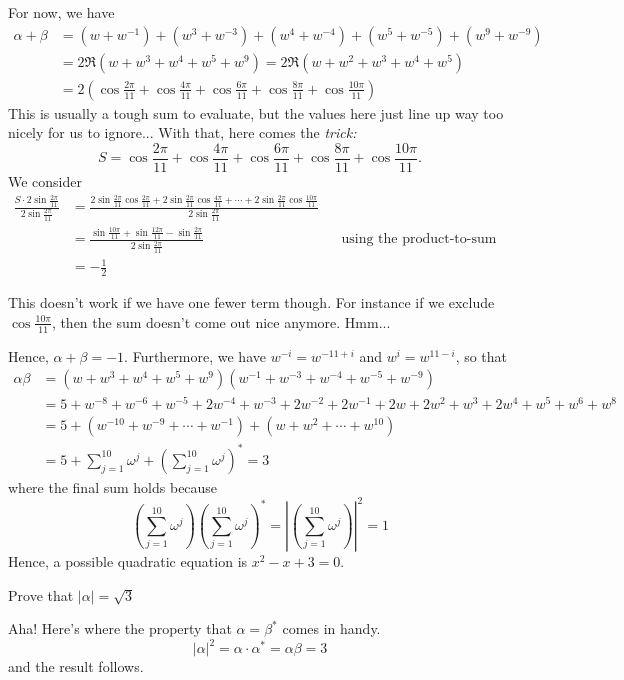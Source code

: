 \documentclass[../main.tex]{subfiles}
\begin{document}
For now, we have
\begin{align*}
    \alpha+\beta &= (w+w^{-1})+(w^3+w^{-3})+(w^4+w^{-4})+(w^5+w^{-5})+(w^9+w^{-9}) \\
    &= 2\Re(w+w^3+w^4+w^5+w^9) = 2\Re(w+w^2+w^3+w^4+w^5) \\
    &= 2\left(\cos{\frac{2\pi}{11}}+\cos{\frac{4\pi}{11}}+\cos{\frac{6\pi}{11}}+\cos{\frac{8\pi}{11}}+\cos{\frac{10\pi}{11}}\right)
\end{align*}
This is usually a tough sum to evaluate, but the values here just line up way too nicely for us to ignore... With that, here comes the \textit{trick:}  $$S=\cos{\frac{2\pi}{11}}+\cos{\frac{4\pi}{11}}+\cos{\frac{6\pi}{11}}+\cos{\frac{8\pi}{11}}+\cos{\frac{10\pi}{11}}.$$ We consider
\begin{align*}
    \frac{S\cdot2\sin{\frac{2\pi}{11}}}{2\sin{\frac{2\pi}{11}}} &= \frac{2\sin{\frac{2\pi}{11}}\cos{\frac{2\pi}{11}}+2\sin{\frac{2\pi}{11}}\cos{\frac{4\pi}{11}}+\cdots +2\sin{\frac{2\pi}{11}}\cos{\frac{10\pi}{11}}}{2\sin{\frac{2\pi}{11}}}\\
    &= \frac{\sin{\frac{10\pi}{11}}+\sin{\frac{12\pi}{11}}-\sin{\frac{2\pi}{11}}}{2\sin{\frac{2\pi}{11}}} &&\text{using the product-to-sum formula}\\
    &= -\frac{1}{2}
\end{align*}
\begin{remark}
This doesn't work if we have one fewer term though. For instance if we exclude $\cos{\frac{10\pi}{11}}$, then the sum doesn't come out nice anymore. Hmm...
\end{remark}
Hence, $\alpha+\beta=-1$. Furthermore, we have $w^{-i}=w^{-11+i}$ and $w^i=w^{11-i}$, so that
\begin{align*}
    \alpha\beta&=(w+w^3+w^4+w^5+w^9)(w^{-1}+w^{-3}+w^{-4}+w^{-5}+w^{-9}) \\
    &=5+w^{-8}+w^{-6}+w^{-5}+2w^{-4}+w^{-3}+2w^{-2}+2w^{-1}+2w+2w^2+w^3+2w^4+w^5+w^6+w^8 \\
    &=5+(w^{-10}+w^{-9}+\cdots+w^{-1})+(w+w^2+\cdots+w^{10}) \\
    &=5+\sum_{j=1}^{10} \omega^{j}+\left(\sum_{j=1}^{10} \omega^{j}\right)^{*} = 3
\end{align*}
where the final sum holds because 
$$\left(\sum_{j=1}^{10} \omega^{j}\right)\left(\sum_{j=1}^{10} \omega^{j}\right)^{*}=\left|\left(\sum_{j=1}^{10} \omega^{j}\right)\right|^2=1$$
Hence, a possible quadratic equation is $x^2-x+3=0$.
\begin{example}[cont..]
Prove that $|\alpha|=\sqrt{3}$
\end{example}
Aha! Here's where the property that $\alpha=\beta^{*}$ comes in handy. 
$$|\alpha|^2=\alpha\cdot\alpha^{*}=\alpha\beta=3$$
and the result follows.
\end{document}
